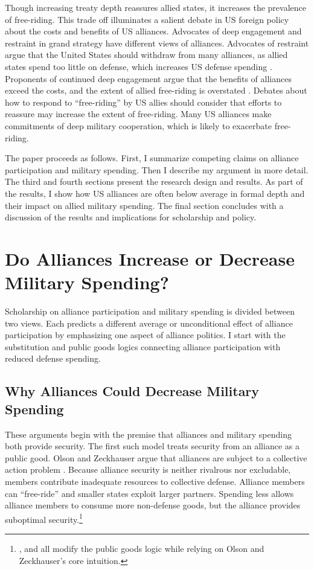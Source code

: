 \documentclass[12pt]{article}
\begin{document}
Though increasing treaty depth reassures allied states, it increases the prevalence of free-riding. 
This trade off illuminates a salient debate in US foreign policy about the costs and benefits of US alliances. 
Advocates of deep engagement \citep{Brooksetal2013} and restraint \citep{Posen2014} in grand strategy have different views of alliances. 
Advocates of restraint argue that the United States should withdraw from many alliances, as allied states spend too little on defense, which increases US defense spending \citep{Preble2009}.
Proponents of continued deep engagement argue that the benefits of alliances exceed the costs, and the extent of allied free-riding is overstated \citep{BrandsFeaver2017}. 
Debates about how to respond to ``free-riding'' by US allies should consider that efforts to reassure may increase the extent of free-riding. 
Many US alliances make commitments of deep military cooperation, which is likely to exacerbate free-riding. 


The paper proceeds as follows. 
First, I summarize competing claims on alliance participation and military spending. 
Then I describe my argument in more detail. 
The third and fourth sections present the research design and results. 
As part of the results, I show how US alliances are often below average in formal depth and their impact on allied military spending. 
The final section concludes with a discussion of the results and implications for scholarship and policy.  



\section{Do Alliances Increase or Decrease Military Spending?}


Scholarship on alliance participation and military spending is divided between two views.
Each predicts a different average or unconditional effect of alliance participation by emphasizing one aspect of alliance politics.  
I start with the substitution and public goods logics connecting alliance participation with reduced defense spending. 


\subsection{Why Alliances Could Decrease Military Spending} 


These arguments begin with the premise that alliances and military spending both provide security.
The first such model treats security from an alliance as a public good. 
Olson and Zeckhauser argue that alliances are subject to a collective action problem \citep{OlsonZeckhauser1966}.
Because alliance security is neither rivalrous nor excludable, members contribute inadequate resources to collective defense. 
Alliance members can ``free-ride'' and smaller states exploit larger partners. 
Spending less allows alliance members to consume more non-defense goods, but the alliance provides suboptimal security.\footnote{\citet{SandlerForbes1980}, \citet{Oneal1990} and \citet{SandlerHartley2001} all modify the public goods logic while relying on Olson and Zeckhauser's core intuition.} 
\end{document}
